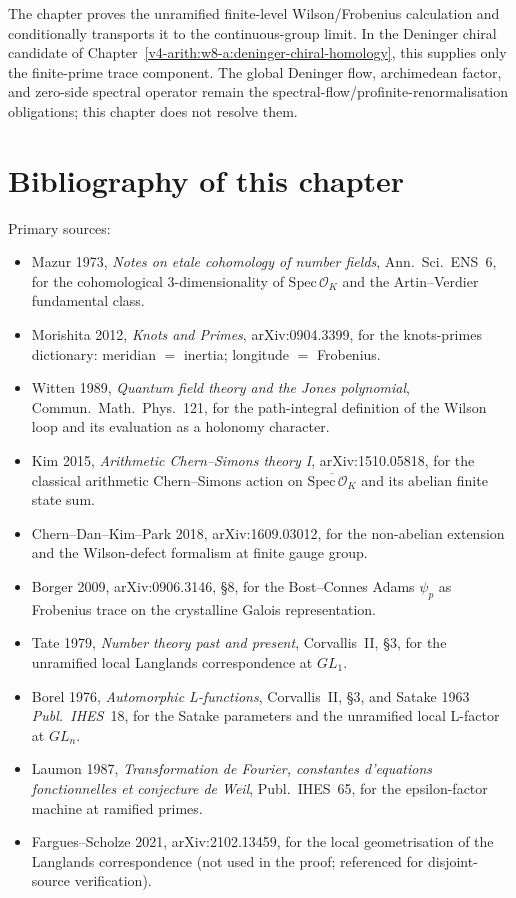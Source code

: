 The chapter proves the unramified finite-level Wilson/Frobenius
calculation and conditionally transports it to the continuous-group
limit. In the Deninger chiral candidate of
Chapter~\ref{v4-arith:w8-a:deninger-chiral-homology}, this supplies
only the finite-prime trace component. The global Deninger flow,
archimedean factor, and zero-side spectral operator remain the
spectral-flow/profinite-renormalisation obligations; this chapter does
not resolve them.

\section*{Bibliography of this chapter}
\label{v4-arith:w9-r1:biblio}

Primary sources:

\begin{itemize}
\item Mazur 1973, \emph{Notes on etale cohomology of number fields},
Ann.~Sci.~ENS~6, for the cohomological 3-dimensionality of
\(\mathrm{Spec}\,\mathcal O_{K}\) and the Artin--Verdier
fundamental class.
\item Morishita 2012, \emph{Knots and Primes}, arXiv:0904.3399,
for the knots-primes dictionary: meridian \(=\) inertia; longitude
\(=\) Frobenius.
\item Witten 1989, \emph{Quantum field theory and the Jones
polynomial}, Commun.~Math.~Phys.~121, for the path-integral
definition of the Wilson loop and its evaluation as a holonomy
character.
\item Kim 2015, \emph{Arithmetic Chern--Simons theory I},
arXiv:1510.05818, for the classical arithmetic Chern--Simons
action on \(\overline{\mathrm{Spec}\,\mathcal O_{K}}\) and its
abelian finite state sum.
\item Chern--Dan--Kim--Park 2018, arXiv:1609.03012, for the
non-abelian extension and the Wilson-defect formalism at finite
gauge group.
\item Borger 2009, arXiv:0906.3146, \S8, for the
Bost--Connes Adams \(\psi_{p}\) as Frobenius trace on the
crystalline Galois representation.
\item Tate 1979, \emph{Number theory past and present},
Corvallis~II, \S3, for the unramified local Langlands
correspondence at \(GL_{1}\).
\item Borel 1976, \emph{Automorphic L-functions}, Corvallis~II,
\S3, and Satake 1963 \emph{Publ.~IHES}~18, for the Satake
parameters and the unramified local L-factor at \(GL_{n}\).
\item Laumon 1987, \emph{Transformation de Fourier, constantes
d'equations fonctionnelles et conjecture de Weil},
Publ.~IHES~65, for the epsilon-factor machine at ramified
primes.
\item Fargues--Scholze 2021, arXiv:2102.13459, for the local
geometrisation of the Langlands correspondence (not used in the
proof; referenced for disjoint-source verification).
\end{itemize}
